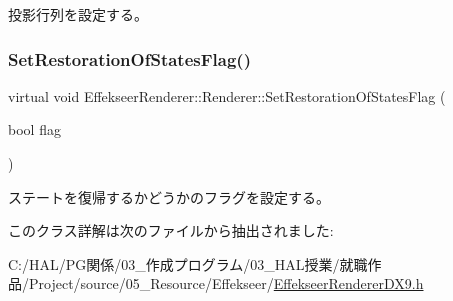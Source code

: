 投影行列を設定する。 

\mbox{\label{class_effekseer_renderer_1_1_renderer_ac6de8a0c0d65c03d3242ccfc9946c91c}} 
\subsubsection{\texorpdfstring{Set\+Restoration\+Of\+States\+Flag()}{SetRestorationOfStatesFlag()}}
{\footnotesize\ttfamily virtual void Effekseer\+Renderer\+::\+Renderer\+::\+Set\+Restoration\+Of\+States\+Flag (\begin{DoxyParamCaption}\item[{bool}]{flag }\end{DoxyParamCaption})\hspace{0.3cm}{\ttfamily [pure virtual]}}



ステートを復帰するかどうかのフラグを設定する。 



このクラス詳解は次のファイルから抽出されました\+:\begin{DoxyCompactItemize}
\item 
C\+:/\+H\+A\+L/\+P\+G関係/03\+\_\+作成プログラム/03\+\_\+\+H\+A\+L授業/就職作品/\+Project/source/05\+\_\+\+Resource/\+Effekseer/\mbox{\hyperlink{_effekseer_renderer_d_x9_8h}{Effekseer\+Renderer\+D\+X9.\+h}}\end{DoxyCompactItemize}

